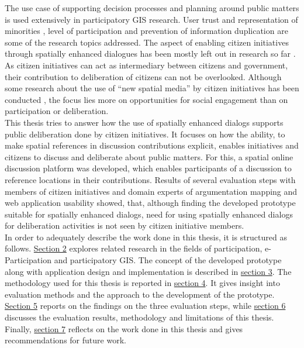 The use case of supporting decision processes and planning around public matters is used extensively in participatory GIS research. User trust and representation of minorities \cite{Carver2001_PPGIS_Cyberdemocracy}, level of participation \cite{Steinmann2005_Combination_Ladder_GIS} and prevention of information duplication \cite{Hopfer2007_Communication} are some of the research topics addressed. The aspect of enabling citizen initiatives through spatially enhanced dialogues has been mostly left out in research so far \cite{Cai2009_spatial_annotation_deliberation}. As citizen initiatives can act as intermediary between citizens and government, their contribution to deliberation of citizens can not be overlooked. Although some research about the use of ``new spatial media'' by citizen initiatives has been conducted \cite{Elwood2013_NewSpatialMedia}, the focus lies more on opportunities for social engagement than on participation or deliberation.\\
This thesis tries to answer how the use of spatially enhanced dialogs supports public deliberation done by citizen initiatives. It focuses on how the ability, to make spatial references in discussion contributions explicit, enables initiatives and citizens to discuss and deliberate about public matters. For this, a spatial online discussion platform was developed, which enables participants of a discussion to reference locations in their contributions. Results of several evaluation steps with members of citizen initiatives and domain experts of argumentation mapping and web application usability showed, that, although finding the developed prototype suitable for spatially enhanced dialogs, need for using spatially enhanced dialogs for deliberation activities is not seen by citizen initiative members.\\
In order to adequately describe the work done in this thesis, it is structured as follows. \hyperref[chap:related_work]{Section 2} explores related research in the fields of participation, e-Participation and participatory GIS. The concept of the developed prototype along with application design and implementation is described in \hyperref[chap:approach]{section 3}. The methodology used for this thesis is reported in \hyperref[chap:methodology]{section 4}. It gives insight into evaluation methods and the approach to the development of the prototype. \hyperref[chap:methodology]{Section 5} reports on the findings on the three evaluation steps, while \hyperref[chap:discussion]{section 6} discusses the evaluation results, methodology and limitations of this thesis. Finally, \hyperref[chap:conclusion]{section 7} reflects on the work done in this thesis and gives recommendations for future work.




